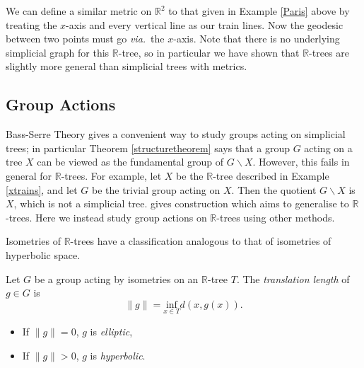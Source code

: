 \begin{example}\label{xtrains}
    We can define a similar metric on $\mathbb{R}^2$ to that given in Example \ref{Paris} above by treating the $x$-axis and every vertical line as our train lines. Now the geodesic between two points must go \textit{via.}~the $x$-axis. Note that there is no underlying simplicial graph for this $\mathbb{R}$-tree, so in particular we have shown that $\mathbb{R}$-trees are slightly more general than simplicial trees with metrics.
\end{example}

\subsection{Group Actions}
Bass-Serre Theory gives a convenient way to study groups acting on simplicial trees; in particular Theorem \ref{structuretheorem} says that a group $G$ acting on a tree $X$ can be viewed as the fundamental group of $G\backslash X$. However, this fails in general for $\mathbb{R}$-trees. For example, let $X$ be the $\mathbb{R}$-tree described in Example \ref{xtrains}, and let $G$ be the trivial group acting on $X$. Then the quotient $G\backslash X$ is $X$, which is not a simplicial tree. \cite{Levit_rtrees} gives construction which aims to generalise to $\mathbb{R}$-trees. Here we instead study group actions on $\mathbb{R}$-trees using other methods.

Isometries of $\mathbb{R}$-trees have a classification analogous to that of isometries of hyperbolic space. 
\begin{definition}
    Let $G$ be a group acting by isometries on an $\mathbb{R}$-tree $T$. The \emph{translation length} of $g\in G$ is \[\lVert g\rVert=\underset{x\in T}{\text{inf}}d(x,g(x)).\]
    \begin{itemize}
        \item If $\lVert g\rVert=0$, $g$ is \emph{elliptic},
        \item If $\lVert g\rVert>0$, $g$ is \emph{hyperbolic}.
    \end{itemize}
\end{definition}

